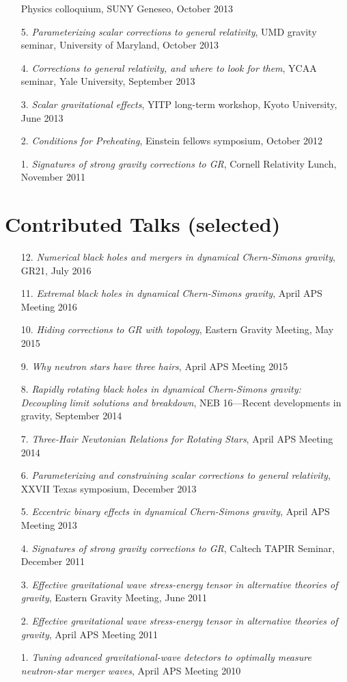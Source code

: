 \begin{enumerate}
  Physics colloquium, SUNY Geneseo, October 2013
\item[{5.}] {\it Parameterizing scalar corrections to general relativity}, UMD gravity seminar,
 University of Maryland, October 2013
\item[{4.}] {\it Corrections to general relativity, and where to look for them},
  YCAA seminar, Yale University, September 2013
\item[{3.}] {\it Scalar gravitational effects}, YITP long-term
  workshop, Kyoto University, June 2013
\item[{2.}] {\it Conditions for Preheating},
  Einstein fellows symposium, October 2012
\item[{1.}] {\it Signatures of strong gravity corrections to GR},
  Cornell Relativity Lunch, November 2011
\end{enumerate}

\section{\sc Contributed Talks (selected)}
\begin{enumerate}
\item[{12.}] {\it Numerical black holes and mergers in dynamical
    Chern-Simons gravity},
  GR21, July 2016
\item[{11.}] {\it Extremal black holes in dynamical Chern-Simons gravity},
 April APS Meeting 2016
\item[{10.}] {\it Hiding corrections to GR with topology},
 Eastern Gravity Meeting, May 2015
\item[{9.}] {\it Why neutron stars have three hairs},
 April APS Meeting 2015
\item[{8.}] {\it Rapidly rotating black holes in dynamical Chern-Simons gravity:
    Decoupling limit solutions and breakdown},
 NEB 16---Recent developments in gravity, September 2014
\item[{7.}] {\it Three-Hair Newtonian Relations for Rotating Stars},
 April APS Meeting 2014
\item[{6.}] {\it Parameterizing and constraining scalar corrections to general relativity},
 XXVII Texas symposium, December 2013
\item[{5.}] {\it Eccentric binary effects in dynamical Chern-Simons gravity},
  April APS Meeting 2013
\item[{4.}] {\it Signatures of strong gravity corrections to GR},
  Caltech TAPIR Seminar, December 2011
\item[{3.}] {\it Effective gravitational wave stress-energy tensor in
    alternative theories of gravity}, Eastern Gravity Meeting, June 2011
\item[{2.}] {\it Effective gravitational wave stress-energy tensor in alternative theories of gravity}, April APS Meeting 2011
\item[{1.}] {\it Tuning advanced gravitational-wave detectors to
    optimally measure neutron-star merger waves}, April APS Meeting 2010
\end{enumerate}


